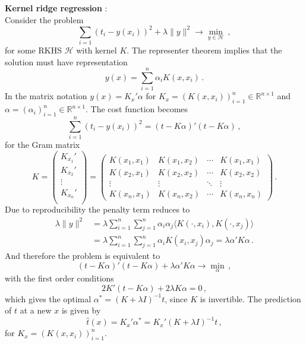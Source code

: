 \documentclass[a4paper]{article}
\newcommand{\Real}{\mathbb{R}}
\newcommand{\Hcal}{\mathcal{H}}
\begin{document}
\noindent\textbf{Kernel ridge regression} : \hfill\\
Consider the problem
\[ \sum_{i=1} (t_i - y(x_i))^2 + \lambda \|y\|^2 \to \min_{y\in \Hcal}\,,\]
for some RKHS $\Hcal$ with kernel $K$. The representer theorem implies that the
solution must have representation
\[ y(x) = \sum_{i=1}^n \alpha_i K(x, x_i)\,. \]
In the matrix notation $y(x) = K_x' \alpha$ for $K_x = (K(x,x_i))_{i=1}^n \in \Real^{n\times 1}$
and $\alpha = (\alpha_i)_{i=1}^n \in \Real^{n\times 1}$. The cost function
becomes	
\[
\sum_{i=1}^n (t_i - y(x_i))^2 = (t-K\alpha)'(t-K\alpha)\,,
\]
for the Gram matrix
\[
K = \begin{pmatrix} K_{x_1}'\\ K_{x_2}'\\ \vdots\\ K_{x_n}'\\ \end{pmatrix}
 = \begin{pmatrix}
		K(x_1,x_1) & K(x_1,x_2) & \cdots & K(x_1,x_1) \\
		K(x_2,x_1) & K(x_2,x_2) & \cdots & K(x_2,x_2) \\
		\vdots & \vdots & \ddots & \vdots \\
		K(x_n,x_1) & K(x_n,x_2) & \cdots & K(x_n,x_n)
	\end{pmatrix}\,.
\]
Due to reproducibility the penalty term reduces to
\begin{align*}
	\lambda \|y\|^2
	&= \lambda \sum_{i=1}^n \sum_{j=1}^n \alpha_i \alpha_j \langle K(\cdot,x_i), K(\cdot,x_j)\rangle\\
	&= \lambda \sum_{i=1}^n \sum_{j=1}^n \alpha_i K(x_i,x_j) \alpha_j
	= \lambda \alpha' K \alpha\,.
\end{align*}
And therefore the problem is equivalent to
\[ (t-K\alpha)'(t-K\alpha) + \lambda \alpha' K \alpha \to \min_\alpha\,,\]
with the first order conditions
\[ 2 K'(t-K\alpha) + 2 \lambda K \alpha = 0 \,, \]
which gives the optimal $\alpha^* = (K+\lambda I)^{-1} t$, since $K$ is invertible.
The prediction of $t$ at a new $x$ is given by
\[ \hat{t}(x) = K_x'\alpha^* = K_x' (K + \lambda I)^{-1} t \,, \]
for $K_x = (K(x,x_i))_{i=1}^n$.

\end{document}
